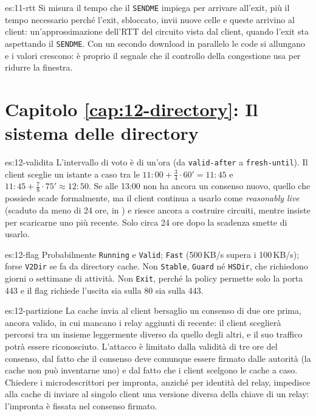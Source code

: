 \begin{soluzione}{es:11-rtt}
Si misura il tempo che il \texttt{SENDME} impiega per arrivare all'exit, più il tempo necessario perché l'exit, sbloccato, invii nuove celle e queste arrivino al client: un'approssimazione dell'RTT del circuito vista dal client, quando l'exit sta aspettando il \texttt{SENDME}. Con un secondo download in parallelo le code si allungano e i valori crescono: è proprio il segnale che il controllo della congestione usa per ridurre la finestra.
\end{soluzione}

\section*{Capitolo \ref{cap:12-directory}: Il sistema delle directory}

\begin{soluzione}{es:12-validita}
L'intervallo di voto è di un'ora (da \texttt{valid-after} a \texttt{fresh-until}). Il client sceglie un istante a caso tra le $11{:}00 + \tfrac34 \cdot 60' = 11{:}45$ e $11{:}45 + \tfrac78 \cdot 75' \approx 12{:}50$. Se alle 13:00 non ha ancora un consenso nuovo, quello che possiede scade formalmente, ma il client continua a usarlo come \emph{reasonably live} (scaduto da meno di 24 ore,  in ) e riesce ancora a costruire circuiti, mentre insiste per scaricarne uno più recente. Solo circa 24 ore dopo la scadenza smette di usarlo.
\end{soluzione}

\begin{soluzione}{es:12-flag}
Probabilmente \texttt{Running} e \texttt{Valid}; \texttt{Fast} (500\,KB/s supera i 100\,KB/s); forse \texttt{V2Dir} se fa da directory cache. Non \texttt{Stable}, \texttt{Guard} né \texttt{HSDir}, che richiedono giorni o settimane di attività. Non \texttt{Exit}, perché la policy permette solo la porta 443 e il flag richiede l'uscita sia sulla 80 sia sulla 443.
\end{soluzione}

\begin{soluzione}{es:12-partizione}
La cache invia al client bersaglio un consenso di due ore prima, ancora valido, in cui mancano i relay aggiunti di recente: il client sceglierà percorsi tra un insieme leggermente diverso da quello degli altri, e il suo traffico potrà essere riconosciuto. L'attacco è limitato dalla validità di tre ore del consenso, dal fatto che il consenso deve comunque essere firmato dalle autorità (la cache non può inventarne uno) e dal fatto che i client scelgono le cache a caso. Chiedere i microdescrittori per impronta, anziché per identità del relay, impedisce alla cache di inviare al singolo client una versione diversa della chiave di un relay: l'impronta è fissata nel consenso firmato.
\end{soluzione}

